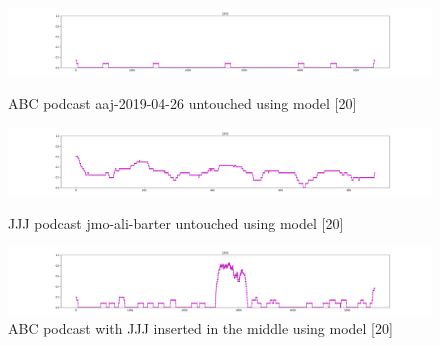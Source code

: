 
%
%


\begin{figure}[b!]
\begin{center}

\includegraphics[scale=0.2]{src/main-matter/results/experiment-age/entropy/audio_aug/[20]/abc}
\caption{ABC podcast aaj-2019-04-26 untouched using model [20]}

\includegraphics[scale=0.2]{src/main-matter/results/experiment-age/entropy/audio_aug/[20]/jjj}
\caption{JJJ podcast jmo-ali-barter untouched using model [20]}


\includegraphics[scale=0.2]{src/main-matter/results/experiment-age/entropy/audio_aug/[20]/abc-middle-jjj}
\caption{ABC podcast with JJJ inserted in the middle using model [20]}

\label{default}
\end{center}
\end{figure}


